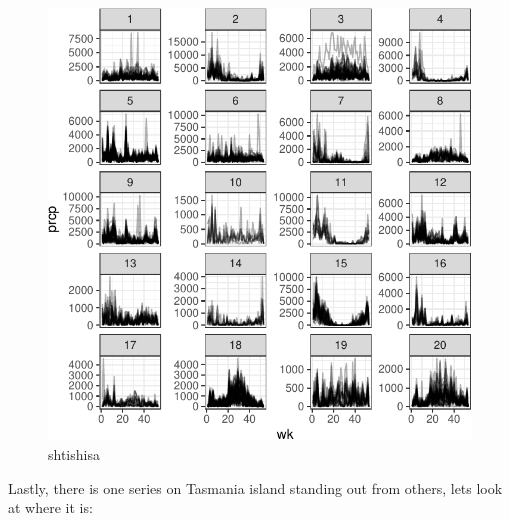 \documentclass[
]{jss}
\begin{document}
\begin{CodeChunk}
\begin{figure}

{\centering \includegraphics{figures/unnamed-chunk-16-1} 

}

\caption[shtishisa]{shtishisa}\label{fig:unnamed-chunk-16}
\end{figure}
\end{CodeChunk}

Lastly, there is one series on Tasmania island standing out from others,
lets look at where it is:
\end{document}
